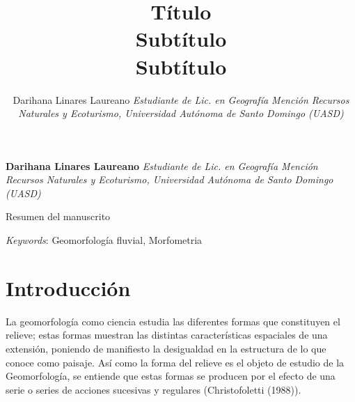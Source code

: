\documentclass[11pt,]{article}
\title{Título\\
Subtítulo\\
Subtítulo  }
\author{\Large Darihana Linares Laureano\vspace{0.05in} \newline\normalsize\emph{Estudiante de Lic. en Geografía Mención Recursos Naturales y Ecoturismo,
Universidad Autónoma de Santo Domingo (UASD)}  }
\date{}
\newcommand*{\authorfont}{\fontfamily{phv}\selectfont}
\renewenvironment{abstract}
 {{%
    \setlength{\leftmargin}{0mm}
    \setlength{\rightmargin}{\leftmargin}%
  }%
  \relax}
 {\endlist}
\begin{document}
	
%

{%
\setlength{\parindent}{0pt}
\thispagestyle{plain}
{\fontsize{18}{20}\selectfont\raggedright 
\maketitle  %

}

{
   \vskip 13.5pt\relax \normalsize\fontsize{11}{12} 
\textbf{\authorfont Darihana Linares Laureano} \hskip 15pt \emph{\small Estudiante de Lic. en Geografía Mención Recursos Naturales y Ecoturismo,
Universidad Autónoma de Santo Domingo (UASD)}   

}

}








\begin{abstract}

    \hbox{\vrule height .2pt width 39.14pc}

    \vskip 8.5pt %

\noindent Resumen del manuscrito


\vskip 8.5pt \noindent \emph{Keywords}: Geomorfología fluvial, Morfometria \par

    \hbox{\vrule height .2pt width 39.14pc}



\end{abstract}


\vskip 6.5pt


\noindent  \section{Introducción}\label{introducciuxf3n}

La geomorfología como ciencia estudia las diferentes formas que
constituyen el relieve; estas formas muestran las distintas
características espaciales de una extensión, poniendo de manifiesto la
desigualdad en la estructura de lo que conoce como paisaje. Así como la
forma del relieve es el objeto de estudio de la Geomorfología, se
entiende que estas formas se producen por el efecto de una serie o
series de acciones sucesivas y regulares (Christofoletti (1988)).
\end{document}
